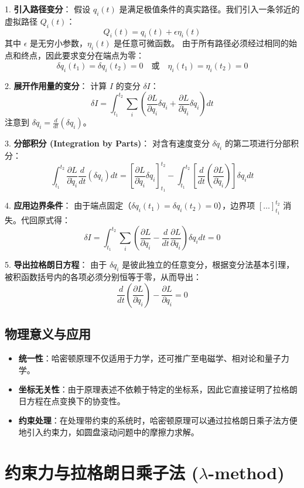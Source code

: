 \documentclass[11pt,a4paper]{article}
\begin{document}
1. \textbf{引入路径变分}：
   假设 $q_i(t)$ 是满足极值条件的真实路径。我们引入一条邻近的虚拟路径 $Q_i(t)$：
   \[ Q_i(t) = q_i(t) + \epsilon \eta_i(t) \]
   其中 $\epsilon$ 是无穷小参数，$\eta_i(t)$ 是任意可微函数。
   由于所有路径必须经过相同的始点和终点，因此要求变分在端点为零：
   \[ \delta q_i(t_1) = \delta q_i(t_2) = 0 \quad \text{或} \quad \eta_i(t_1) = \eta_i(t_2) = 0 \]

2. \textbf{展开作用量的变分}：
   计算 $I$ 的变分 $\delta I$：
   \[ \delta I = \int_{t_1}^{t_2} \sum_i \left( \frac{\partial L}{\partial q_i} \delta q_i + \frac{\partial L}{\partial \dot{q}_i} \delta \dot{q}_i \right) dt \]
   注意到 $\delta \dot{q}_i = \frac{d}{dt}(\delta q_i)$。

3. \textbf{分部积分 (Integration by Parts)}：
   对含有速度变分 $\delta \dot{q}_i$ 的第二项进行分部积分：
   \[ \int_{t_1}^{t_2} \frac{\partial L}{\partial \dot{q}_i} \frac{d}{dt}(\delta q_i) dt = \left[ \frac{\partial L}{\partial \dot{q}_i} \delta q_i \right]_{t_1}^{t_2} - \int_{t_1}^{t_2} \left[ \frac{d}{dt} \left( \frac{\partial L}{\partial \dot{q}_i} \right) \right] \delta q_i dt \]

4. \textbf{应用边界条件}：
   由于端点固定（$\delta q_i(t_1) = \delta q_i(t_2) = 0$），边界项 $\left[ \dots \right]_{t_1}^{t_2}$ 消失。代回原式得：
   \[ \delta I = \int_{t_1}^{t_2} \sum_i \left( \frac{\partial L}{\partial q_i} - \frac{d}{dt} \frac{\partial L}{\partial \dot{q}_i} \right) \delta q_i dt = 0 \]

5. \textbf{导出拉格朗日方程}：
   由于 $\delta q_i$ 是彼此独立的任意变分，根据变分法基本引理，被积函数括号内的各项必须分别恒等于零，从而导出：
   \[ \boxed{\frac{d}{dt} \left( \frac{\partial L}{\partial \dot{q}_i} \right) - \frac{\partial L}{\partial q_i} = 0} \]

\subsection{物理意义与应用}
\begin{itemize}
    \item \textbf{统一性}：哈密顿原理不仅适用于力学，还可推广至电磁学、相对论和量子力学。
    \item \textbf{坐标无关性}：由于原理表述不依赖于特定的坐标系，因此它直接证明了拉格朗日方程在点变换下的协变性。
    \item \textbf{约束处理}：在处理带约束的系统时，哈密顿原理可以通过拉格朗日乘子法方便地引入约束力，如圆盘滚动问题中的摩擦力求解。
\end{itemize}
\section{约束力与拉格朗日乘子法 ($\lambda$-method)}
\end{document}
